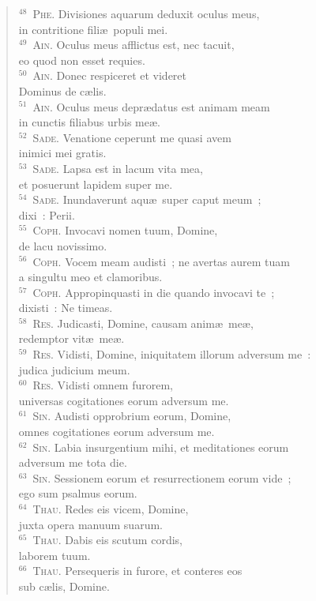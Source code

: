 \begin{flushleft}
\begin{verse}
${}^{48}$~\textsc{Phe.} Divisiones aquarum deduxit oculus meus,\\ in contritione fili\ae\ populi mei.\\
${}^{49}$~\textsc{Ain.} Oculus meus afflictus est, nec tacuit,\\ eo quod non esset requies.\\
${}^{50}$~\textsc{Ain.} Donec respiceret et videret\\ Dominus de c\ae lis.\\
${}^{51}$~\textsc{Ain.} Oculus meus depr\ae datus est animam meam\\ in cunctis filiabus urbis me\ae .\\
${}^{52}$~\textsc{Sade.} Venatione ceperunt me quasi avem\\ inimici mei gratis.\\
${}^{53}$~\textsc{Sade.} Lapsa est in lacum vita mea,\\ et posuerunt lapidem super me.\\
${}^{54}$~\textsc{Sade.} Inundaverunt aqu\ae\ super caput meum~;\\ dixi~: Perii.\\
${}^{55}$~\textsc{Coph.} Invocavi nomen tuum, Domine,\\ de lacu novissimo.\\
${}^{56}$~\textsc{Coph.} Vocem meam audisti~; ne avertas aurem tuam\\ a singultu meo et clamoribus.\\
${}^{57}$~\textsc{Coph.} Appropinquasti in die quando invocavi te~;\\ dixisti~: Ne timeas.\\
${}^{58}$~\textsc{Res.} Judicasti, Domine, causam anim\ae\ me\ae ,\\ redemptor vit\ae\ me\ae .\\
${}^{59}$~\textsc{Res.} Vidisti, Domine, iniquitatem illorum adversum me~:\\ judica judicium meum.\\
${}^{60}$~\textsc{Res.} Vidisti omnem furorem,\\ universas cogitationes eorum adversum me.\\
${}^{61}$~\textsc{Sin.} Audisti opprobrium eorum, Domine,\\ omnes cogitationes eorum adversum me.\\
${}^{62}$~\textsc{Sin.} Labia insurgentium mihi, et meditationes eorum\\ adversum me tota die.\\
${}^{63}$~\textsc{Sin.} Sessionem eorum et resurrectionem eorum vide~;\\ ego sum psalmus eorum.\\
${}^{64}$~\textsc{Thau.} Redes eis vicem, Domine,\\ juxta opera manuum suarum.\\
${}^{65}$~\textsc{Thau.} Dabis eis scutum cordis,\\ laborem tuum.\\
${}^{66}$~\textsc{Thau.} Persequeris in furore, et conteres eos\\ sub c\ae lis, Domine.\end{verse}\end{flushleft}


